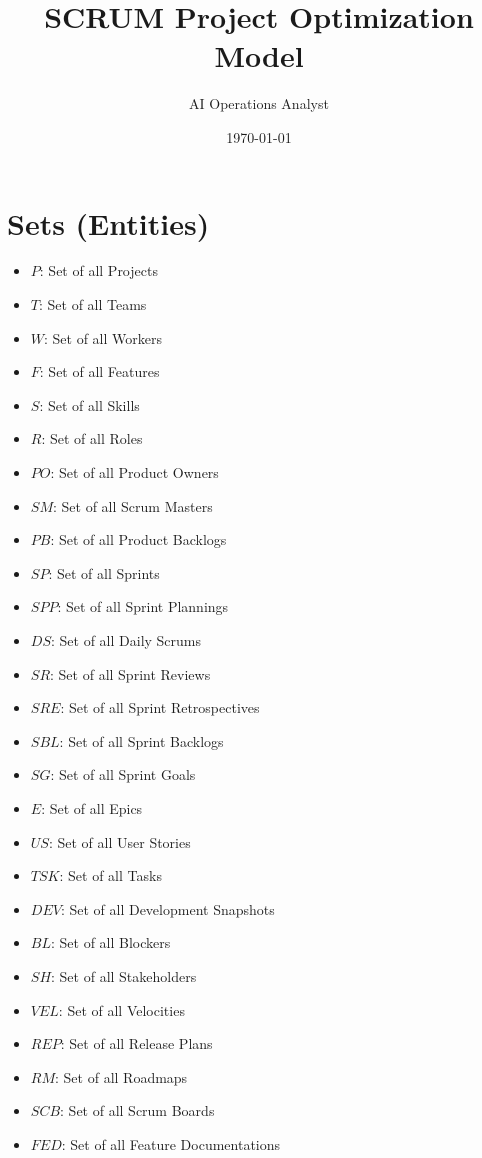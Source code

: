 \documentclass[11pt]{article}
\title{SCRUM Project Optimization Model}
\author{AI Operations Analyst}
\date{\today}
\begin{document}
\maketitle

\renewcommand{\contentsname}{Table of Contents}
\tableofcontents
\newpage

\section{Sets (Entities)}
\begin{itemize}[label=--]
    \item $P$: Set of all Projects
    \item $T$: Set of all Teams
    \item $W$: Set of all Workers
    \item $F$: Set of all Features
    \item $S$: Set of all Skills
    \item $R$: Set of all Roles
    \item $PO$: Set of all Product Owners
    \item $SM$: Set of all Scrum Masters
    \item $PB$: Set of all Product Backlogs
    \item $SP$: Set of all Sprints
    \item $SPP$: Set of all Sprint Plannings
    \item $DS$: Set of all Daily Scrums
    \item $SR$: Set of all Sprint Reviews
    \item $SRE$: Set of all Sprint Retrospectives
    \item $SBL$: Set of all Sprint Backlogs
    \item $SG$: Set of all Sprint Goals
    \item $E$: Set of all Epics
    \item $US$: Set of all User Stories
    \item $TSK$: Set of all Tasks
    \item $DEV$: Set of all Development Snapshots
    \item $BL$: Set of all Blockers
    \item $SH$: Set of all Stakeholders
    \item $VEL$: Set of all Velocities
    \item $REP$: Set of all Release Plans
    \item $RM$: Set of all Roadmaps
    \item $SCB$: Set of all Scrum Boards
    \item $FED$: Set of all Feature Documentations
\end{itemize}
\end{document}
